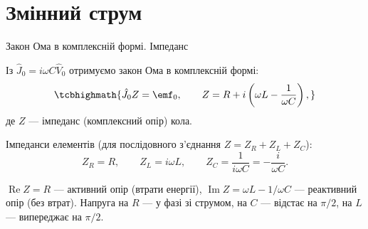\documentclass[onlytextwidth]{beamer}
\begin{document}
\section{Змінний струм}

\begin{frame}{Закон Ома в комплексній формі. Імпеданс}{}
	\begin{block}{}\justifying
		Із $\hat J_0 = i\omega C\hat V_0$ отримуємо \alert{закон Ома в комплексній формі}:
		\begin{equation*}
			\tcbhighmath{
				\hat J_0 Z = \emf_0, \qquad
				Z = R + i\left(\omega L - \frac1{\omega C}\right),
			}
		\end{equation*}
		де $Z$ --- \alert{імпеданс} (комплексний опір) кола.
	\end{block}
	\begin{block}{}\justifying
		Імпеданси елементів (для послідовного з'єднання $Z=Z_R+Z_L+Z_C$):
		\begin{equation*}
			Z_R = R, \qquad Z_L = i\omega L, \qquad Z_C = \frac1{i\omega C} = -\frac{i}{\omega C}.
		\end{equation*}
	\end{block}
	\begin{exampleblock}{}\justifying\small
		$\operatorname{Re}Z=R$ --- \alert{активний опір} (втрати енергії), $\operatorname{Im}Z=\omega L-1/\omega C$ --- \alert{реактивний опір} (без втрат). Напруга на $R$ --- у фазі зі струмом, на $C$ --- відстає на $\pi/2$, на $L$ --- випереджає на $\pi/2$.
	\end{exampleblock}
\end{frame}
\end{document}
